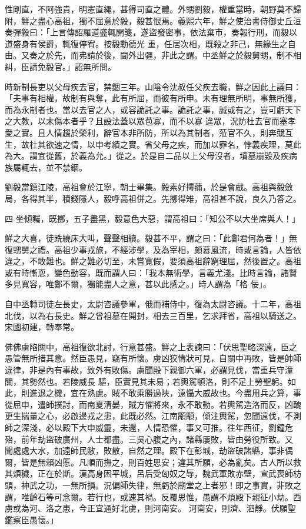 \begin{pinyinscope}
 性剛直，不阿強貴，明憲直繩，甚得司直之體。外甥劉毅，權重當時，朝野莫不歸附，鮮之盡心高祖，獨不屈意於毅，毅甚恨焉。義熙六年，鮮之使治書侍御史丘洹奏彈毅曰：「上言傳詔羅道盛輒開箋，遂盜發密事，依法棄市，奏報行刑，而毅以道盛身有侯爵，輒復停宥。按毅勳德光
 重，任居次相，既殺之非己，無緣生之自由。又奏之於先，而弗請於後，閫外出疆，非此之謂。中丞鮮之於毅舅甥，制不相糾，臣請免毅官。」詔無所問。



 時新制長吏以父母疾去官，禁錮三年。山陰令沈叔任父疾去職，鮮之因此上議曰：「夫事有相權，故制有與奪，此有所屈，而彼有所申。未有理無所明，事無所獲，而為永制者也。當以去官之人，或容詭託之事。詭託之事，誠或有之，豈可虧天下之大教，以末傷本者乎？且設法蓋以眾苞寡，而不以寡
 違眾，況防杜去官而塞孝愛之實。且人情趨於榮利，辭官本非所防，所以為其制者，蒞官不久，則奔競互生，故杜其欲速之情，以申考績之實。省父母之疾，而加以罪名，悖義疾理，莫此為大。謂宜從舊，於義為允。」從之。於是自二品以上父母沒者，墳墓崩毀及疾病族屬輒去，並不禁錮。



 劉毅當鎮江陵，高祖會於江寧，朝士畢集。毅素好摴蒱，於是會戲。高祖與毅斂局，各得其半，積錢隱人，毅呼高祖併之。先擲得雉，高祖甚不說，良久乃答之。



 四
 坐傾矚，既擲，五子盡黑，毅意色大惡，謂高祖曰：「知公不以大坐席與人！」



 鮮之大喜，徒跣繞床大叫，聲聲相續。毅甚不平，謂之曰：「此鄭君何為者！」無復甥舅之禮。高祖少事戎旅，不經涉學，及為宰相，頗慕風流，時或言論，人皆依違之，不敢難也。鮮之難必切至，未嘗寬假，要須高祖辭窮理屈，然後置之。高祖或有時慚恧，變色動容，既而謂人曰：「我本無術學，言義尤淺。比時言論，諸賢多見寬容，唯鄭不爾，獨能盡人之意，甚以此感之。」時人謂為「格
 佞」。



 自中丞轉司徒左長史，太尉咨議參軍，俄而補侍中，復為太尉咨議。十二年，高祖北伐，以為右長史。鮮之曾祖墓在開封，相去三百里，乞求拜省，高祖以騎送之。宋國初建，轉奉常。



 佛佛虜陷關中，高祖復欲北討，行意甚盛。鮮之上表諫曰：「伏思聖略深遠，臣之愚管無所措其意。然臣愚見，竊有所懷。虜凶狡情狀可見，自關中再敗，皆是帥師違律，非是內有事故，致外有敗傷。虜聞殿下親御六軍，必謂見伐，當重兵守潼關，其勢然也。若陵威長
 驅，臣實見其未易；若輿駕頓洛，則不足上勞聖躬。如此，則進退之機，宜在熟慮。賊不敢乘勝過陜，遠懾大威故也。今盡用兵之算，事從屈申，遣師撲討，而南夏清晏，賊方懼將來，永不敢動。若輿駕造洛而反，凶醜更生揣量之心，必啟邊戎之患，此既必然。江南顒顒，傾注輿駕，忽聞遠伐，不測師之深淺，必以殿下大申威靈，未還，人情恐懼，事又可推。往年西征，劉鐘危殆，前年劫盜破廣州，人士都盡。三吳心腹之內，諸縣屢敗，皆由勞役所致。又
 聞處處大水，加遠師民敝，敗散，自然之理。殿下在彭城，劫盜破諸縣，事非偶爾，皆是無賴凶慝。凡順而撫之，則百姓思安；違其所願，必為亂矣。古人所以救其煩穢，正在於斯。漢高身困平城，呂后受匈奴之辱，魏武軍敗赤壁，宣武喪師枋頭，神武之功，一無所損。況偏師失律，無虧於廟堂之上者邪！即之事實，非敗之謂，唯齡石等可念爾。若行也，或速其禍。反覆思惟，愚謂不煩殿下親征小劫。西虜或為河、洛之患，今正宜通好北虜，則河南安。
 河南安，則濟、泗靜。伏願聖鑑察臣愚懷。」




\end{pinyinscope}
